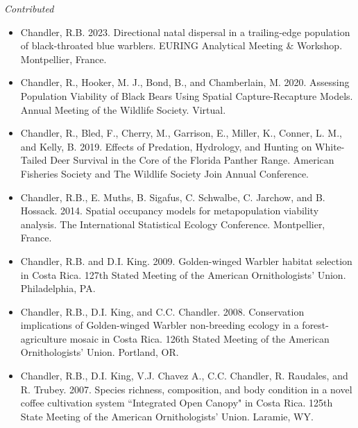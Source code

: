\documentclass[12pt]{article}
\begin{document}

\emph{Contributed}

\begin{itemize}

\item Chandler, R.B. 2023. Directional natal dispersal in a
  trailing-edge population of black-throated blue warblers. EURING
  Analytical Meeting \& Workshop. Montpellier, France. 
  
\item Chandler, R., Hooker, M. J., Bond, B., and Chamberlain,
  M. 2020. Assessing Population Viability of Black Bears Using Spatial
  Capture-Recapture Models. Annual Meeting of the Wildlife
  Society. Virtual.

\item Chandler, R., Bled, F., Cherry, M., Garrison, E., Miller, K.,
  Conner, L. M., and Kelly, B. 2019. Effects of Predation, Hydrology,
  and Hunting on White-Tailed Deer Survival in the Core of the Florida
  Panther Range. American Fisheries Society and The Wildlife Society
  Join Annual Conference. 
  

\item Chandler, R.B., E. Muths, B. Sigafus, C. Schwalbe, C. Jarchow,
  and B. Hossack. 2014. Spatial occupancy models for metapopulation
  viability analysis. The International Statistical Ecology
  Conference. Montpellier, France.

\item Chandler, R.B. and D.I. King. 2009. Golden-winged Warbler
  habitat selection in Costa Rica. 127th Stated Meeting of the
  American Ornithologists’ Union. Philadelphia, PA.

\item Chandler, R.B., D.I. King, and
  C.C. Chandler. 2008. Conservation implications of Golden-winged
  Warbler non-breeding ecology in a forest-agriculture mosaic in Costa
  Rica. 126th Stated Meeting of the American Ornithologists’
  Union. Portland, OR.

\item Chandler, R.B., D.I. King, V.J. Chavez A., C.C. Chandler,
  R. Raudales, and R. Trubey. 2007. Species richness, composition, and
  body condition in a novel coffee cultivation system ``Integrated Open
  Canopy" in Costa Rica. 125th State Meeting of the American
  Ornithologists’ Union. Laramie, WY.


\end{itemize}
\end{document}
